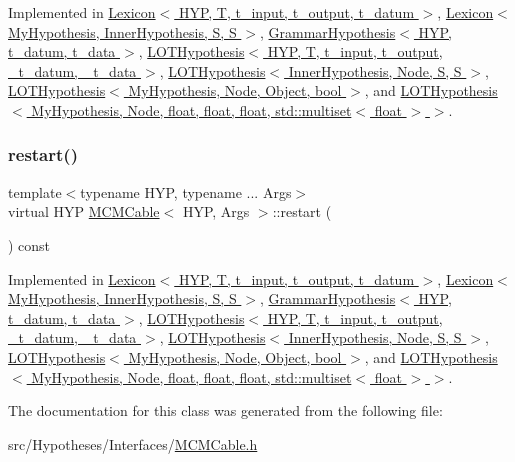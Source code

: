 Implemented in \hyperlink{class_lexicon_a94910b8357fe18f3ae13df8bdd56ca4e}{Lexicon$<$ H\+Y\+P, T, t\+\_\+input, t\+\_\+output, t\+\_\+datum $>$}, \hyperlink{class_lexicon_a94910b8357fe18f3ae13df8bdd56ca4e}{Lexicon$<$ My\+Hypothesis, Inner\+Hypothesis, S, S $>$}, \hyperlink{class_grammar_hypothesis_a5b642e0ccd5c1cebdbd3f7dfdc81cfcf}{Grammar\+Hypothesis$<$ H\+Y\+P, t\+\_\+datum, t\+\_\+data $>$}, \hyperlink{class_l_o_t_hypothesis_a5ae913b145b15308d5817c6e7b1da14d}{L\+O\+T\+Hypothesis$<$ H\+Y\+P, T, t\+\_\+input, t\+\_\+output, \+\_\+t\+\_\+datum, \+\_\+t\+\_\+data $>$}, \hyperlink{class_l_o_t_hypothesis_a5ae913b145b15308d5817c6e7b1da14d}{L\+O\+T\+Hypothesis$<$ Inner\+Hypothesis, Node, S, S $>$}, \hyperlink{class_l_o_t_hypothesis_a5ae913b145b15308d5817c6e7b1da14d}{L\+O\+T\+Hypothesis$<$ My\+Hypothesis, Node, Object, bool $>$}, and \hyperlink{class_l_o_t_hypothesis_a5ae913b145b15308d5817c6e7b1da14d}{L\+O\+T\+Hypothesis$<$ My\+Hypothesis, Node, float, float, float, std\+::multiset$<$ float $>$ $>$}.

\mbox{\label{class_m_c_m_cable_a220d6c4ca73e20441c14fa5bd3e090d3}} 
\subsubsection{\texorpdfstring{restart()}{restart()}}
{\footnotesize\ttfamily template$<$typename H\+YP, typename ... Args$>$ \\
virtual H\+YP \hyperlink{class_m_c_m_cable}{M\+C\+M\+Cable}$<$ H\+YP, Args $>$\+::restart (\begin{DoxyParamCaption}{ }\end{DoxyParamCaption}) const\hspace{0.3cm}{\ttfamily [pure virtual]}}



Implemented in \hyperlink{class_lexicon_a5817e922e09a2723c53eb69506f647fb}{Lexicon$<$ H\+Y\+P, T, t\+\_\+input, t\+\_\+output, t\+\_\+datum $>$}, \hyperlink{class_lexicon_a5817e922e09a2723c53eb69506f647fb}{Lexicon$<$ My\+Hypothesis, Inner\+Hypothesis, S, S $>$}, \hyperlink{class_grammar_hypothesis_a8d0042f4858879ce2585df382ce78b0a}{Grammar\+Hypothesis$<$ H\+Y\+P, t\+\_\+datum, t\+\_\+data $>$}, \hyperlink{class_l_o_t_hypothesis_aec55db1efe43a1ce4bb4a2daacd0f1b7}{L\+O\+T\+Hypothesis$<$ H\+Y\+P, T, t\+\_\+input, t\+\_\+output, \+\_\+t\+\_\+datum, \+\_\+t\+\_\+data $>$}, \hyperlink{class_l_o_t_hypothesis_aec55db1efe43a1ce4bb4a2daacd0f1b7}{L\+O\+T\+Hypothesis$<$ Inner\+Hypothesis, Node, S, S $>$}, \hyperlink{class_l_o_t_hypothesis_aec55db1efe43a1ce4bb4a2daacd0f1b7}{L\+O\+T\+Hypothesis$<$ My\+Hypothesis, Node, Object, bool $>$}, and \hyperlink{class_l_o_t_hypothesis_aec55db1efe43a1ce4bb4a2daacd0f1b7}{L\+O\+T\+Hypothesis$<$ My\+Hypothesis, Node, float, float, float, std\+::multiset$<$ float $>$ $>$}.



The documentation for this class was generated from the following file\+:\begin{DoxyCompactItemize}
\item 
src/\+Hypotheses/\+Interfaces/\hyperlink{_m_c_m_cable_8h}{M\+C\+M\+Cable.\+h}\end{DoxyCompactItemize}
